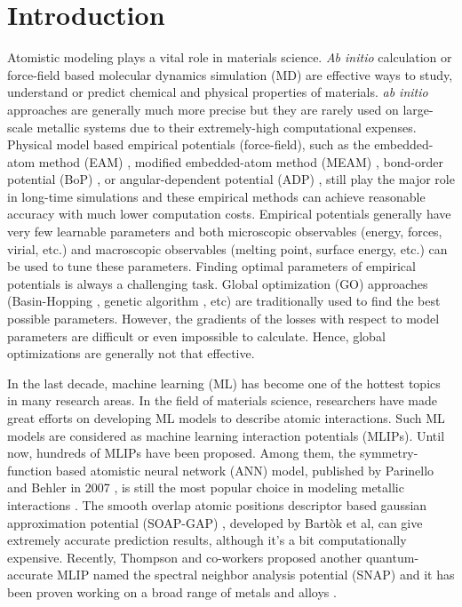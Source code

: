 \documentclass[final,3p,times]{elsarticle}
\begin{document}
\section{Introduction}
\label{sec:introduction}

Atomistic modeling plays a vital role in materials science. \textit{Ab initio} 
calculation or force-field based molecular dynamics simulation (MD) are 
effective ways to study, understand or predict chemical and physical properties 
of materials. \textit{ab initio} approaches are generally much more precise but 
they are rarely used on large-scale metallic systems due to their extremely-high 
computational expenses. Physical model based empirical potentials (force-field), 
such as the embedded-atom method (EAM) \cite{EAM0,EAM1,EAM2,EAM3,EAM4}, 
modified embedded-atom method (MEAM) \cite{MEAM0,MEAM1,MEAM2,MEAM_Jelinek}, 
bond-order potential (BoP) \cite{BOP0,BOP1,BOP2,BOP3}, or angular-dependent 
potential (ADP) \cite{ADP0,ADP1,ADP2,ADP3,ADP_FeNi}, still play the major role 
in long-time simulations and these empirical methods can achieve reasonable 
accuracy with much lower computation costs. Empirical potentials 
generally have very few learnable parameters and both microscopic observables 
(energy, forces, virial, etc.) and macroscopic observables (melting 
point, surface energy, etc.) can be used to tune these parameters. Finding 
optimal parameters of empirical potentials is always a challenging task. Global 
optimization (GO) approaches (Basin-Hopping \cite{BH0,BH1}, genetic algorithm 
\cite{PCIPY,PGA}, etc) are traditionally used to find the best possible 
parameters. However, the gradients of the losses with respect to model 
parameters are difficult or even impossible to calculate. Hence, 
global optimizations are generally not that effective.

In the last decade, machine learning (ML) has become one of the hottest 
topics in many research areas. In the field of materials science, researchers 
have made great efforts on developing ML models to describe atomic interactions. 
Such ML 
models are considered as machine learning interaction potentials (MLIPs). Until 
now, hundreds of MLIPs have been proposed. Among them, the symmetry-function 
based atomistic neural network (ANN) model, published by Parinello and Behler in 
2007 \cite{SF2007,SF1,SF2,SF3,SF4}, is still the most popular choice in modeling 
metallic interactions \cite{SFApp0,SFApp1,SFApp2}. 
The smooth overlap atomic positions descriptor based gaussian approximation 
potential (SOAP-GAP) \cite{soap0,soap1,soap2,soap3}, developed by Bartòk et al, 
can give extremely accurate prediction results, although it's a bit 
computationally expensive. 
Recently, Thompson and co-workers proposed another quantum-accurate MLIP named 
the spectral neighbor analysis potential (SNAP) \cite{SNAP_Algo} and it has 
been proven working on a broad range of metals and 
alloys \cite{SNAP_Mo,SNAP,SNAP_New}.
\end{document}
